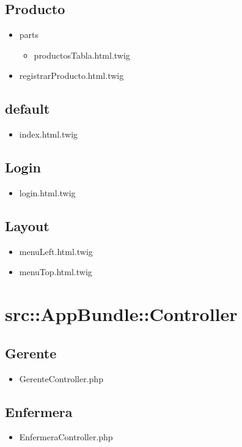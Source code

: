 		\subsection{Producto}	
			\begin{itemize}
			\item parts
			\begin{itemize}
				\item productosTabla.html.twig
			\end{itemize}
			\item registrarProducto.html.twig
			\end{itemize}

		\subsection{default}
		\begin{itemize}
			\item index.html.twig
		\end{itemize}
		\subsection{Login}
		\begin{itemize}
			\item login.html.twig
		\end{itemize}
		\subsection{Layout}
		\begin{itemize}
			\item menuLeft.html.twig
			\item menuTop.html.twig
		\end{itemize}
	\section{src::AppBundle::Controller}
	\subsection{Gerente}
	\begin{itemize}
		\item GerenteController.php
	\end{itemize}
	\subsection{Enfermera}
	\begin{itemize}
		\item EnfermeraController.php
	\end{itemize}
